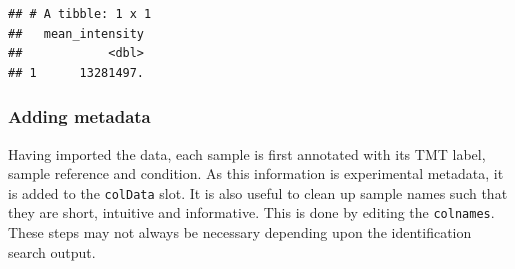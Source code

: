 \documentclass[9pt,a4paper,]{extarticle}
\newenvironment{Shaded}{\begin{snugshade}}{\end{snugshade}}
\newcommand{\AttributeTok}[1]{\textcolor[rgb]{0.13,0.29,0.53}{#1}}
\newcommand{\DecValTok}[1]{\textcolor[rgb]{0.00,0.00,0.81}{#1}}
\newcommand{\DocumentationTok}[1]{\textcolor[rgb]{0.56,0.35,0.01}{\textbf{\textit{#1}}}}
\newcommand{\FunctionTok}[1]{\textcolor[rgb]{0.13,0.29,0.53}{\textbf{#1}}}
\newcommand{\NormalTok}[1]{#1}
\newcommand{\OtherTok}[1]{\textcolor[rgb]{0.56,0.35,0.01}{#1}}
\newcommand{\SpecialCharTok}[1]{\textcolor[rgb]{0.81,0.36,0.00}{\textbf{#1}}}
\newcommand{\StringTok}[1]{\textcolor[rgb]{0.31,0.60,0.02}{#1}}
\begin{document}
\begin{verbatim}
## # A tibble: 1 x 1
##   mean_intensity
##            <dbl>
## 1      13281497.
\end{verbatim}

\hypertarget{adding-metadata}{%
\subsubsection{Adding metadata}\label{adding-metadata}}

Having imported the data, each sample is first annotated with its TMT label,
sample reference and condition. As this information is experimental metadata, it
is added to the \texttt{colData} slot. It is also useful to clean up sample names such
that they are short, intuitive and informative. This is done by editing the
\texttt{colnames}. These steps may not always be necessary depending upon the
identification search output.

\begin{Shaded}
\end{Shaded}
\end{document}
